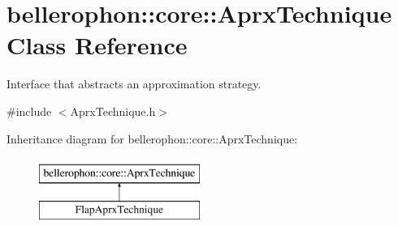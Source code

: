 \hypertarget{classbellerophon_1_1core_1_1AprxTechnique}{}\section{bellerophon\+:\+:core\+:\+:Aprx\+Technique Class Reference}
\label{classbellerophon_1_1core_1_1AprxTechnique}


Interface that abstracts an approximation strategy.  




{\ttfamily \#include $<$Aprx\+Technique.\+h$>$}

Inheritance diagram for bellerophon\+:\+:core\+:\+:Aprx\+Technique\+:\begin{figure}[H]
\begin{center}
\leavevmode
\includegraphics[height=2.000000cm]{classbellerophon_1_1core_1_1AprxTechnique}
\end{center}
\end{figure}
